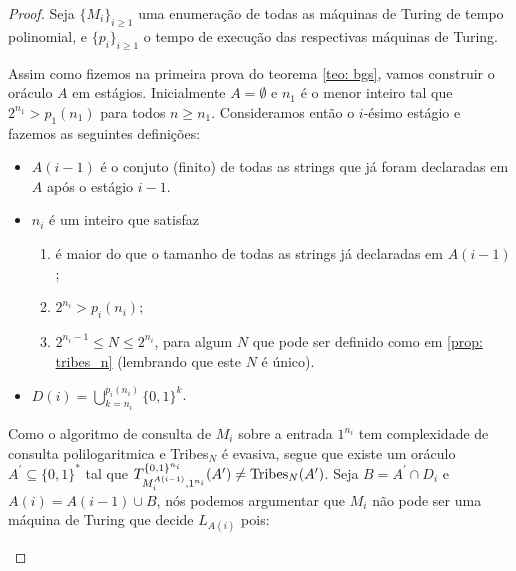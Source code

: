 \begin{proof}

Seja $\{M_{i}\}_{i \geq 1}$ uma enumeração de todas as máquinas de Turing de tempo polinomial, e $\{p_{i}\}_{i \geq 1}$ o tempo de execução das respectivas máquinas de Turing.

Assim como fizemos na primeira prova do teorema \ref{teo: bgs}, vamos construir o oráculo $A$ em estágios. Inicialmente $A = \emptyset$ e $n_{1}$ é o menor inteiro tal que $2^{n_{1}} > p_{1}(n_{1})$ para todos $n \geq n_{1}$. Consideramos então o $i$-ésimo estágio e fazemos as seguintes definições:

\begin{itemize}

    \item $A(i - 1)$ é o conjuto (finito) de todas as strings que já foram declaradas em $A$ após o estágio $i - 1$.

    \item $n_{i}$ é um inteiro que satisfaz

    \begin{enumerate}

        \item é maior do que o tamanho de todas as strings já declaradas em $A(i - 1)$;

        \item $2^{n_{i}} > p_{i}(n_{i})$;

        \item $2^{n_{i} - 1} \leq N \leq 2^{n_{i}}$, para algum $N$ que pode ser definido como em \ref{prop: tribes_n} (lembrando que este $N$ é único).

    \end{enumerate}

    \item $D(i) = \bigcup_{k = n_{i}}^{p_{i}(n_{i})}\{0, 1\}^{k}$.


\end{itemize}

Como o algoritmo de consulta de $M_{i}$ sobre a entrada $1^{n_{i}}$ tem complexidade de consulta polilogaritmica e Tribes$_{N}$ é evasiva, segue que existe um oráculo $A^{\prime} \subseteq \{0, 1\}^{*}$ tal que $T_{M_{i}^{A(i - 1)}, 1^{n_{i}}}^{\{0, 1\}^{n_{i}}}(A^{\prime}) \neq \text{Tribes}_{N}(A^{\prime})$. Seja $B = A^{\prime} \cap D_{i}$ e $A(i) = A(i - 1) \cup B$, nós podemos argumentar que $M_{i}$ não pode ser uma máquina de Turing que decide $L_{A(i)}$ pois:

\begin{itemize}


\end{itemize}
\end{proof}
